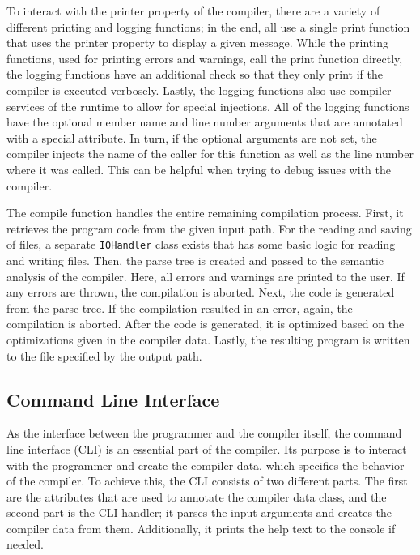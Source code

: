 To interact with the printer property of the compiler, there are a variety of different printing and logging functions; in the end, all use a single print function that uses the printer property to display a given message. While the printing functions, used for printing errors and warnings, call the print function directly, the logging functions have an additional check so that they only print if the compiler is executed verbosely. Lastly, the logging functions also use compiler services of the runtime to allow for special injections. All of the logging functions have the optional member name and line number arguments that are annotated with a special attribute. In turn, if the optional arguments are not set, the compiler injects the name of the caller for this function as well as the line number where it was called. This can be helpful when trying to debug issues with the compiler.

The compile function handles the entire remaining compilation process. First, it retrieves the program code from the given input path. For the reading and saving of files, a separate \texttt{IOHandler} class exists that has some basic logic for reading and writing files. Then, the parse tree is created and passed to the semantic analysis of the compiler. Here, all errors and warnings are printed to the user. If any errors are thrown, the compilation is aborted. Next, the code is generated from the parse tree. If the compilation resulted in an error, again, the compilation is aborted. After the code is generated, it is optimized based on the optimizations given in the compiler data. Lastly, the resulting program is written to the file specified by the output path.

\subsection{Command Line Interface}
\label{sec:implementation_cli}
As the interface between the programmer and the compiler itself, the command line interface (CLI) is an essential part of the compiler. 
Its purpose is to interact with the programmer and create the compiler data, which specifies the behavior of the compiler. 
To achieve this, the CLI consists of two different parts. The first are the attributes that are used to annotate the compiler data class, and the second part is the CLI handler; it parses the input arguments and creates the compiler data from them. Additionally, it prints the help text to the console if needed.

